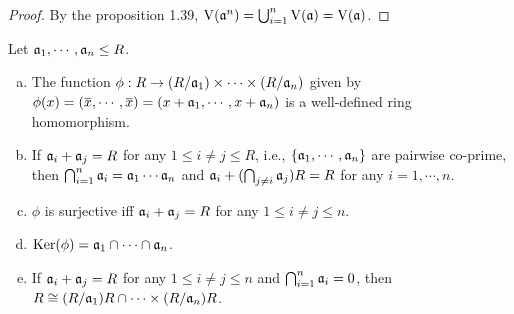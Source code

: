 \begin{proof}
    By the proposition 1.39, $\operatorname{V}(\mathfrak{a}^n) = \bigcup_{i=1}^n \operatorname{V}(\mathfrak{a}) = \operatorname{V}(\mathfrak{a})$.
\end{proof}

\begin{proposition}[CRT]
    Let $\mathfrak{a}_1,\cdots,\mathfrak{a}_n \leq R$.
    \begin{enumerate}[(a)]
        \item The function $\phi: R \to (R/\mathfrak{a}_1) \times \cdots \times (R/\mathfrak{a}_n)$ given by $\phi(x) = (\overbar x, \cdots, \overbar x) = (x+\ffa_1,\cdots,x+\ffa_n)$ is a well-defined ring homomorphism.
        \item If $\mathfrak{a}_i + \mathfrak{a}_j = R$ for any $1 \leq i \neq j \leq R$, i.e., $\{\mathfrak{a}_1,\cdots,\mathfrak{a}_n\}$ are pairwise co-prime, then $\bigcap_{i=1}^n \mathfrak{a}_i = \mathfrak{a}_1 \cdots \mathfrak{a}_n$ and $\mathfrak{a}_i + (\bigcap_{j \neq i} \mathfrak{a}_j)R = R$ for any $i = 1,\cdots,n$.
        \item $\phi$ is surjective iff $\mathfrak{a}_i + \mathfrak{a}_j = R$ for any $1 \leq i \neq j \leq n$.
        \item $\operatorname{Ker}(\phi) = \mathfrak{a}_1 \cap \cdots \cap \mathfrak{a}_n$.
        \item If $\mathfrak{a}_i + \mathfrak{a}_j = R$ for any $1 \leq i \neq j \leq n$ and $\bigcap_{i=1}^n \mathfrak{a}_i = 0$, then $R \cong (R/\mathfrak{a}_1)R \cap \cdots \times (R/\mathfrak{a}_n)R$.
    \end{enumerate}
\end{proposition}

